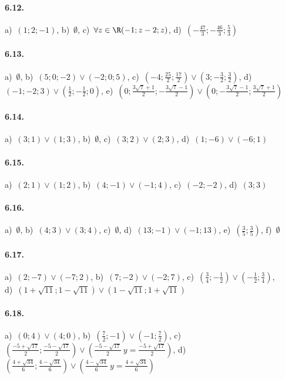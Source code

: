 \paragraph{6.12.} 
a)~\(\left(1;2;-1\right)\),\quad 
b)~\(\emptyset \),\quad 
c)~\(\forall z \in \R (-1;z-2;z)\),\quad 
d)~\(\left(-\frac{47} 3;-\frac{46} 3;\frac 5 3\right)\)

\paragraph{6.13.} 
a)~\(\emptyset \),\quad 
b)~\(\left(5;0;-2\right)\vee \left(-2;0;5\right)\),\quad 
c)~\(\left(-4;\frac{25} 2;\frac{17} 2\right)\vee \left(3;-\frac 3 2;\frac 3 
2\right)\),\quad 
d)~\(\left(-1;-2;3\right)\vee \left(\frac 1 2;-\frac 1 
2;0\right)\),\quad 
e)~\(\left(0;\frac{3\sqrt 7+1} 2;-\frac{3\sqrt 7-1} 
2\right)\vee \left(0;-\frac{3\sqrt 7-1} 2;\frac{3\sqrt 7+1} 2\right)\)

\paragraph{6.14.} 
a)~\((3;1)\vee(1;3)\),\quad 
b)~\(\emptyset \),\quad 
c)~\((3;2)\vee(2;3)\),\quad 
d)~\((1;-6)\vee(-6;1)\)

\paragraph{6.15.} 
a)~\((2;1)\vee(1;2)\),\quad 
b)~\((4;-1)\vee(-1;4)\),\quad 
c)~\((-2;-2)\),\quad 
d)~\((3;3)\)

\paragraph{6.16.} 
a)~\(\emptyset \),\quad 
b)~\((4;3)\vee(3;4)\),\quad 
c)~\(\emptyset \),\quad 
d)~\((13;-1)\vee(-1;13)\),\quad 
e)~\(\left(\frac 3 5;\frac 3 5\right)\),\quad 
f)~\(\emptyset \)

\paragraph{6.17.} 
a)~\((2;-7)\vee(-7;2)\),\quad 
b)~\((7;-2)\vee(-2;7)\),\quad 
c)~\(\left(\frac 3 
4;-\frac 1 2\right)\vee\left(-\frac 1 2;\frac 3 4\right)\),\protect\\
\quad 
d)~\(\left(1+\sqrt{11};1-\sqrt{11}\right)\vee\left(1-\sqrt{11};1+\sqrt{11}
\right)\)

\paragraph{6.18.} 
a)~\((0;4)\vee(4;0)\),\; 
b)~\(\left(\frac 7 2;-1\right)\vee\left(-1;\frac 7 2\right)\),\; 
c)~\(\left(\frac{-5+\sqrt{17}} 2;\frac{-5-\sqrt{17}} 2\right) \vee 
\left(\frac{-5-\sqrt{17}} 2~ y=\frac{-5+\sqrt{17}} 2\right)\),\quad 
d)~\(\left(\frac{4+\sqrt{34}} 6;\frac{4-\sqrt{34}} 6\right)\vee 
\left(\frac{4-\sqrt{34}} 6~y=\frac{4+\sqrt{34}} 6\right)\)

